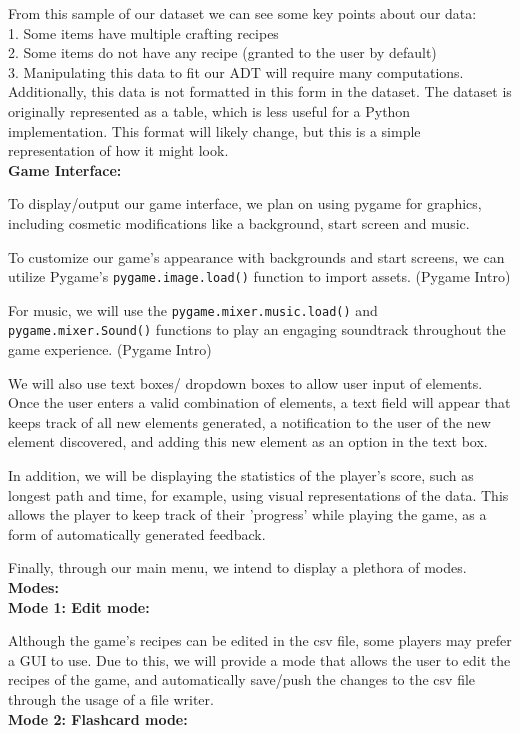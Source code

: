 \documentclass[fontsize=11pt]{article}
\begin{document}
From this sample of our dataset we can see some key points about our data:
\\[3pt]
1. Some items have multiple crafting recipes
\\[3pt]
2. Some items do not have any recipe (granted to the user by default)
\\[3pt]
3. Manipulating this data to fit our ADT will require many computations.
\\[3pt]
\small{Additionally, this data is not formatted in this form in the dataset. The dataset is originally represented as a table, which is less useful for a Python implementation. This format will likely change, but this is a simple representation of how it might look.}
\\[6pt]
\textbf{\large{Game Interface:}}
\normalsize

To display/output our game interface, we plan on using pygame for graphics, including cosmetic modifications like a background, start screen and music. 

To customize our game's appearance with backgrounds and start screens, we can utilize Pygame's \texttt{pygame.image.load()} function to import assets. (Pygame Intro)

For music, we will use the \texttt{pygame.mixer.music.load()} and \texttt{pygame.mixer.Sound()} functions to play an engaging soundtrack throughout the game experience. (Pygame Intro)

We will also use text boxes/ dropdown boxes to allow user input of elements. Once the user enters a valid combination of elements, a text field will appear that keeps track of all new elements generated, a notification to the user of the new element discovered, and adding this new element as an option in the text box.

In addition, we will be displaying the statistics of the player's score, such as longest path and time, for example, using visual representations of the data. This allows the player to keep track of their 'progress' while playing the game, as a form of automatically generated feedback.

Finally, through our main menu, we intend to display a plethora of modes.
\\[6pt]
\textbf{\large{Modes:}}
\normalsize
\\[3pt]
\textbf{Mode 1: Edit mode:}

Although the game's recipes can be edited in the csv file, some players may prefer a GUI to use. Due to this, we will provide a mode that allows the user to edit the recipes of the game, and automatically save/push the changes to the csv file through the usage of a file writer.
\\[3pt]
\textbf{Mode 2: Flashcard mode:}
\end{document}
